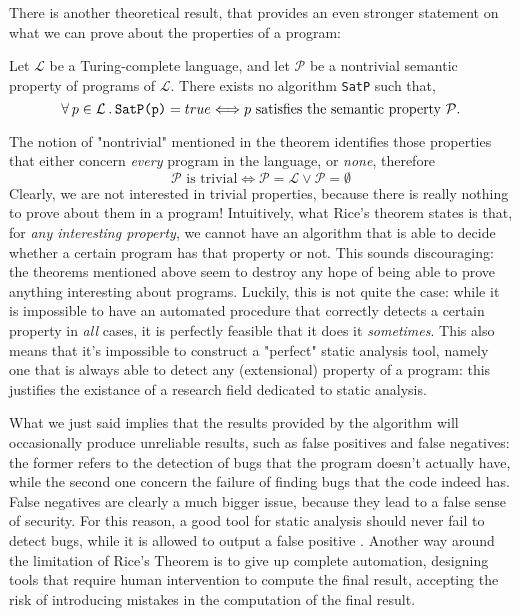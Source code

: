 \documentclass[12pt,a4paper]{book}
\newcommand{\st}{\hspace{2px}.\hspace{2px}}
\theoremstyle{definition}
\begin{document}
	There is another theoretical result, that provides an even stronger statement on what we can prove about the properties of a program:
	\begin{thm} Let $\mathcal{L}$ be a Turing-complete language, and let $\mathcal{P}$ be a nontrivial semantic property of programs of $\mathcal{L}$. There exists no algorithm \texttt{SatP} such that,
		\[
		\forall\hspace{2px}p\in\mathcal{L}\st\texttt{SatP(p)} = true \Longleftrightarrow p\text{ satisfies the semantic property } \mathcal{P}. 	
		\]
	\end{thm}
	The notion of "nontrivial" mentioned in the theorem identifies those properties that either concern \textit{every} program in the language, or \textit{none}, therefore
	\[
	\mathcal{P}\text{ is trivial} \Longleftrightarrow \mathcal{P} = \mathcal{L} \vee \mathcal{P} = \emptyset
	\]
	Clearly, we are not interested in trivial properties, because there is really nothing to prove about them in a program!
	Intuitively, what Rice's theorem states is that, for \textit{any interesting property}, we cannot have an algorithm that is able to decide whether a certain program has that property or not. This sounds discouraging: the theorems mentioned above seem to destroy any hope of being able to prove anything interesting about programs. Luckily, this is not quite the case: while it is impossible to have an automated procedure that correctly detects a certain property in \textit{all} cases, it is perfectly feasible that it does it \textit{sometimes}. This also means that it's impossible to construct a "perfect" static analysis tool, namely one that is always able to detect any (extensional) property of a program: this justifies the existance of a research field dedicated to static analysis.
	
	What we just said implies that the results provided by the algorithm will occasionally produce unreliable results, such as false positives and false negatives: the former refers to the detection of bugs that the program doesn't actually have, while the second one concern the failure of finding bugs that the code indeed has. False negatives are clearly a much bigger issue, because they lead to a false sense of security. For this reason, a good tool for static analysis should never fail to detect bugs, while it is allowed to output a false positive \cite{Gomes2009}. Another way around the limitation of Rice's Theorem is to give up complete automation, designing tools that require human intervention to compute the final result, accepting the risk of introducing mistakes in the computation of the final result.
	
\end{document}
